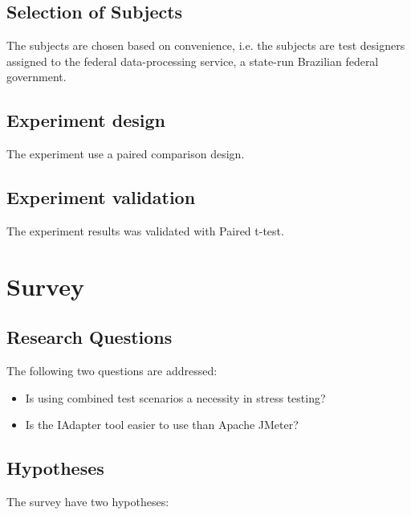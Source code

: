\subsection{Selection of Subjects}

The subjects are chosen based on convenience, i.e. the subjects are test designers assigned to the federal data-processing service, a state-run Brazilian federal government.


\subsection{Experiment design}

The experiment use a paired comparison design. 

\subsection{Experiment validation}

The experiment results was validated with Paired t-test.

\section{Survey}

\subsection{Research Questions}

The following two questions are addressed:
\begin{itemize}
\item Is using combined test scenarios a necessity in stress testing?
\item Is the IAdapter tool easier to use than Apache JMeter?
\end{itemize}

\subsection{Hypotheses}

The survey have two hypotheses:

